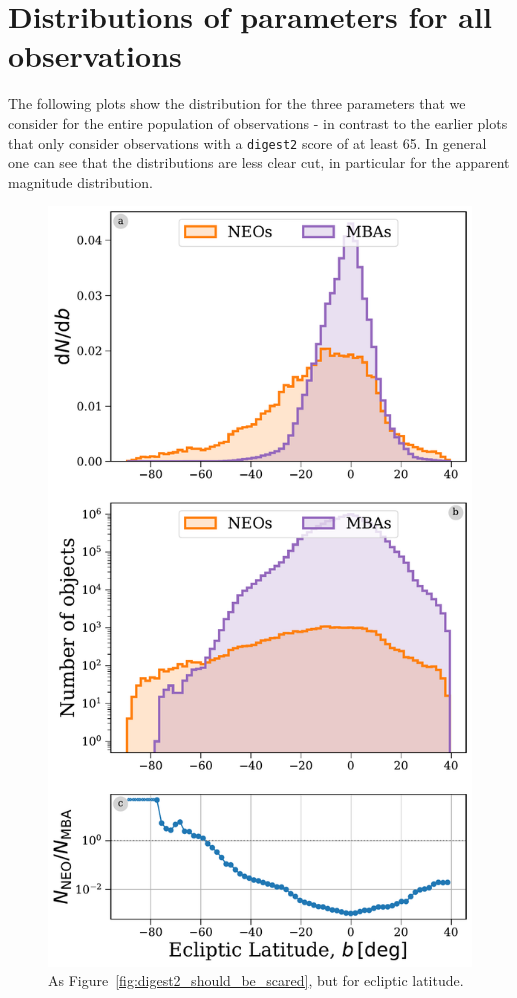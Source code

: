 \documentclass[preprint2, twocolappendix]{aastex631}
\newcommand{\dig}{\texttt{digest2}}
\begin{document}
\section{Distributions of parameters for all observations}

The following plots show the distribution for the three parameters that we consider for the entire population of observations - in contrast to the earlier plots that only consider observations with a \dig{} score of at least 65. In general one can see that the distributions are less clear cut, in particular for the apparent magnitude distribution.

\begin{figure}[htb]
    \centering
    \includegraphics[width=\columnwidth]{figures/ecliptic_latitude_dist_all.pdf}
    \caption{As Figure~\ref{fig:digest2_should_be_scared}, but for ecliptic latitude.}
    \label{fig:ecl_lat_all}
\end{figure}
\end{document}
